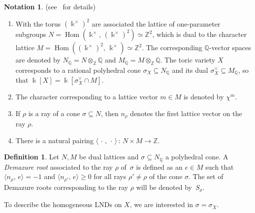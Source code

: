 \documentclass[a4paper,reqno,12pt]{amsart}
\theoremstyle{plain}
\theoremstyle{definition}
\newtheorem{definition}[theorem]{Definition}
\newtheorem{notations}[theorem]{Notation}
\theoremstyle{plain}
\theoremstyle{remark}
\DeclareMathOperator{\Hom}{Hom}
\newcommand{\ZZ}{\mathbb Z}
\newcommand{\QQ}{\mathbb Q}
\begin{document}
\begin{notations}(see~\cite[Chapter~1]{CLS} for details)
\begin{enumerate}
    \item [$(i)$] With the torus $(\Bbbk^\times)^2$ are associated the lattice of one-parameter subgroups $N=\Hom(\Bbbk^\times,\,(\Bbbk^\times)^2)\simeq \ZZ^2$, which is dual to the character lattice $M=\Hom((\Bbbk^\times)^2,\,\Bbbk^{\times})\simeq \ZZ^2$. The corresponding $\QQ$-vector spaces are denoted by $N_{\QQ}=N\otimes_{\ZZ} \QQ$ and $M_{\QQ}=M\otimes_{\ZZ} \QQ$.
The toric variety $X$ corresponds to a rational polyhedral cone $\sigma_X\subseteq N_{\QQ}$ and its dual $\sigma_X^\vee\subseteq M_{\QQ}$, so that $\Bbbk[X]=\Bbbk[\sigma_X^\vee\cap M]$.
    \item [$(ii)$] The character corresponding to a lattice vector $m\in M$ is denoted by $\chi^m$.
    \item [$(iii)$] If $\rho$ is a ray of a cone $\sigma\subseteq N$, then $n_\rho$ denotes the first lattice vector on the ray $\rho$.
    \item [$(iv)$] There is a natural pairing $\langle\,\cdot\,,\,\cdot\,\rangle\,\colon\,N\times M\to\ZZ$.
\end{enumerate}
\end{notations}


\begin{definition}
    Let $N, M$ be dual lattices and $\sigma\subseteq N_{\QQ}$ a polyhedral cone. A \emph{Demazure root} associated to the ray $\rho$ of~$\sigma$ is defined as an $e\in M$ such that $\langle n_\rho,\,e\rangle=-1$ and $\langle n_{\rho'},\, e\rangle\ge0$ for all rays $\rho'\neq\rho$ of the cone $\sigma$. The set of Demazure roots corresponding to the ray $\rho$ will be denoted by~$S_\rho$.
\end{definition}

To describe the homogeneous LNDs on $X$, we are interested in $\sigma=\sigma_X$.
\end{document}
